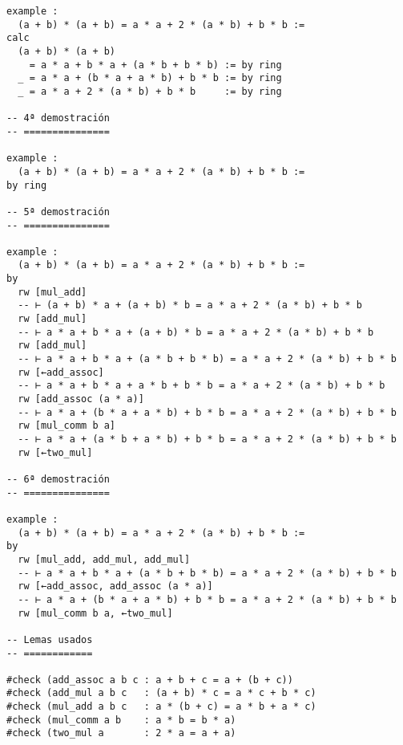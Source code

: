 \begin{verbatim}
example :
  (a + b) * (a + b) = a * a + 2 * (a * b) + b * b :=
calc
  (a + b) * (a + b)
    = a * a + b * a + (a * b + b * b) := by ring
  _ = a * a + (b * a + a * b) + b * b := by ring
  _ = a * a + 2 * (a * b) + b * b     := by ring

-- 4ª demostración
-- ===============

example :
  (a + b) * (a + b) = a * a + 2 * (a * b) + b * b :=
by ring

-- 5ª demostración
-- ===============

example :
  (a + b) * (a + b) = a * a + 2 * (a * b) + b * b :=
by
  rw [mul_add]
  -- ⊢ (a + b) * a + (a + b) * b = a * a + 2 * (a * b) + b * b
  rw [add_mul]
  -- ⊢ a * a + b * a + (a + b) * b = a * a + 2 * (a * b) + b * b
  rw [add_mul]
  -- ⊢ a * a + b * a + (a * b + b * b) = a * a + 2 * (a * b) + b * b
  rw [←add_assoc]
  -- ⊢ a * a + b * a + a * b + b * b = a * a + 2 * (a * b) + b * b
  rw [add_assoc (a * a)]
  -- ⊢ a * a + (b * a + a * b) + b * b = a * a + 2 * (a * b) + b * b
  rw [mul_comm b a]
  -- ⊢ a * a + (a * b + a * b) + b * b = a * a + 2 * (a * b) + b * b
  rw [←two_mul]

-- 6ª demostración
-- ===============

example :
  (a + b) * (a + b) = a * a + 2 * (a * b) + b * b :=
by
  rw [mul_add, add_mul, add_mul]
  -- ⊢ a * a + b * a + (a * b + b * b) = a * a + 2 * (a * b) + b * b
  rw [←add_assoc, add_assoc (a * a)]
  -- ⊢ a * a + (b * a + a * b) + b * b = a * a + 2 * (a * b) + b * b
  rw [mul_comm b a, ←two_mul]

-- Lemas usados
-- ============

#check (add_assoc a b c : a + b + c = a + (b + c))
#check (add_mul a b c   : (a + b) * c = a * c + b * c)
#check (mul_add a b c   : a * (b + c) = a * b + a * c)
#check (mul_comm a b    : a * b = b * a)
#check (two_mul a       : 2 * a = a + a)
\end{verbatim}

